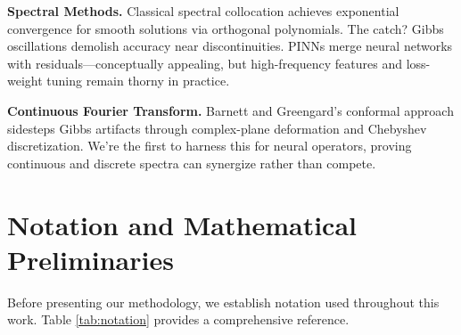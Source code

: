 \documentclass[11pt]{article}
\begin{document}
\textbf{Spectral Methods.} Classical spectral collocation \citep{boyd2001chebyshev,trefethen2019approximation} achieves exponential convergence for smooth solutions via orthogonal polynomials. The catch? Gibbs oscillations demolish accuracy near discontinuities. PINNs \citep{raissi2019physics,karniadakis2021physics} merge neural networks with residuals—conceptually appealing, but high-frequency features and loss-weight tuning remain thorny in practice.

\textbf{Continuous Fourier Transform.} Barnett and Greengard's conformal approach \citep{barnett2010conformal} sidesteps Gibbs artifacts through complex-plane deformation and Chebyshev discretization. We're the first to harness this for neural operators, proving continuous and discrete spectra can synergize rather than compete.

\section{Notation and Mathematical Preliminaries}

Before presenting our methodology, we establish notation used throughout this work. Table \ref{tab:notation} provides a comprehensive reference.
\end{document}
